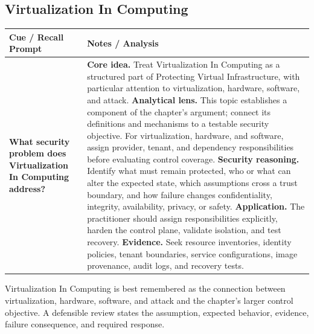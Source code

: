\documentclass[11pt]{article}
\newcommand{\CornellHeader}{%
\rowcolor{Navy}\color{white}\bfseries Cue / Recall Prompt & \color{white}\bfseries Notes / Analysis\\\hline}
\newcommand{\CornellRow}[2]{%
\cellcolor{CueGray}\RaggedRight\textbf{#1} & \RaggedRight #2\\\hline}
\begin{document}
\subsection*{Virtualization In Computing}
\begin{longtable}{>{\RaggedRight\arraybackslash}p{}|>{\RaggedRight\arraybackslash}p{}}
\CornellHeader
\CornellRow{What security problem does Virtualization In Computing address?}{\textbf{Core idea.} Treat Virtualization In Computing as a structured part of Protecting Virtual Infrastructure, with particular attention to virtualization, hardware, software, and attack. \textbf{Analytical lens.} This topic establishes a component of the chapter's argument; connect its definitions and mechanisms to a testable security objective. For virtualization, hardware, and software, assign provider, tenant, and dependency responsibilities before evaluating control coverage. \textbf{Security reasoning.} Identify what must remain protected, who or what can alter the expected state, which assumptions cross a trust boundary, and how failure changes confidentiality, integrity, availability, privacy, or safety. \textbf{Application.} The practitioner should assign responsibilities explicitly, harden the control plane, validate isolation, and test recovery. \textbf{Evidence.} Seek resource inventories, identity policies, tenant boundaries, service configurations, image provenance, audit logs, and recovery tests.}
\end{longtable}
\begin{topicsummary}
Virtualization In Computing is best remembered as the connection between virtualization, hardware, software, and attack and the chapter's larger control objective. A defensible review states the assumption, expected behavior, evidence, failure consequence, and required response.
\end{topicsummary}
\end{document}
